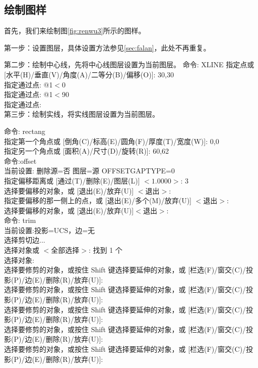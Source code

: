 \subsection{绘制图样}
首先，我们来绘制图\ref{fig:renwu3}所示的图样。

第一步：设置图层，具体设置方法参见\ref{sec:falan}，此处不再重复。

第二步：绘制中心线，先将中心线图层设置为当前图层。
\noindent
命令: XLINE 指定点或 [水平(H)/垂直(V)/角度(A)/二等分(B)/偏移(O)]: 30,30\\
指定通过点: @1$<$0\\
指定通过点: @1$<$90\\
指定通过点:\\
\indent
第三步：绘制实线，将实线图层设置为当前图层。

\noindent
命令: rectang\\
指定第一个角点或 [倒角(C)/标高(E)/圆角(F)/厚度(T)/宽度(W)]: 0,0\\
指定另一个角点或 [面积(A)/尺寸(D)/旋转(R)]: 60,62\\
命令:offset\\
当前设置: 删除源=否  图层=源  OFFSETGAPTYPE=0\\
指定偏移距离或 [通过(T)/删除(E)/图层(L)] $<1.0000>$:  3\\
选择要偏移的对象，或 [退出(E)/放弃(U)] $<$退出$>$:\\
指定要偏移的那一侧上的点，或 [退出(E)/多个(M)/放弃(U)] $<$退出$>$:\\
选择要偏移的对象，或 [退出(E)/放弃(U)]$<$退出$>$:\\
命令: trim\\
当前设置:投影=UCS，边=无\\
选择剪切边...\\
选择对象或 $<$全部选择$>$:  找到 1 个\\
选择对象:\\
选择要修剪的对象，或按住 Shift 键选择要延伸的对象，或
[栏选(F)/窗交(C)/投影(P)/边(E)/删除(R)/放弃(U)]:\\
选择要修剪的对象，或按住 Shift 键选择要延伸的对象，或
[栏选(F)/窗交(C)/投影(P)/边(E)/删除(R)/放弃(U)]:\\
选择要修剪的对象，或按住 Shift 键选择要延伸的对象，或
[栏选(F)/窗交(C)/投影(P)/边(E)/删除(R)/放弃(U)]:\\
选择要修剪的对象，或按住 Shift 键选择要延伸的对象，或
[栏选(F)/窗交(C)/投影(P)/边(E)/删除(R)/放弃(U)]:\\
选择要修剪的对象，或按住 Shift 键选择要延伸的对象，或
[栏选(F)/窗交(C)/投影(P)/边(E)/删除(R)/放弃(U)]:\\
